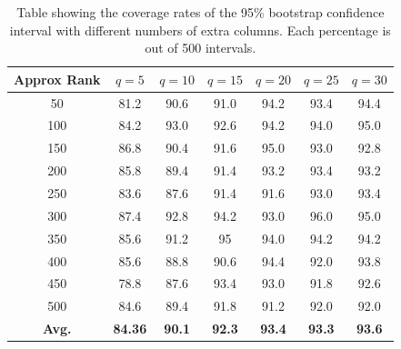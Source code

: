 \documentclass[11pt]{article}
\begin{document}
\begin{table}[h]
    \centering
    \begin{tabular}{c|c|c|c|c|c|c|}
         Approx Rank & $q = 5$ & $q = 10$ & $q=15$ & $q = 20$ & $q = 25$ & $q = 30$ \\
         \midrule
         50 & 81.2& 90.6 & 91.0 & 94.2 & 93.4 & 94.4\\
         100 & 84.2& 93.0 & 92.6 & 94.2 & 94.0 & 95.0\\
         150 & 86.8& 90.4 & 91.6 & 95.0 & 93.0 & 92.8\\
         200 & 85.8 & 89.4 & 91.4 & 93.2 & 93.4 & 93.2\\
         250 & 83.6 & 87.6 & 91.4 & 91.6 & 93.0 & 93.4\\
         300 & 87.4 & 92.8 & 94.2 & 93.0 & 96.0 & 95.0\\
         350 & 85.6 & 91.2 & 95 & 94.0 & 94.2 & 94.2\\
         400 & 85.6 & 88.8 & 90.6 & 94.4 & 92.0 & 93.8\\
         450 & 78.8 & 87.6 & 93.4 & 93.0 & 91.8  & 92.6\\
         500 & 84.6 & 89.4 & 91.8 & 91.2 & 92.0 & 92.0\\
         \textbf{Avg.} & \textbf{84.36} & \textbf{90.1} & \textbf{92.3} & \textbf{93.4} & \textbf{93.3} & \textbf{93.6}
    \end{tabular}
    \caption{Table showing the coverage rates of the 95\% bootstrap confidence interval with different numbers of extra columns. Each percentage is out of 500 intervals.}
    \label{tab:chan-cov-boot}
\end{table}
\end{document}
